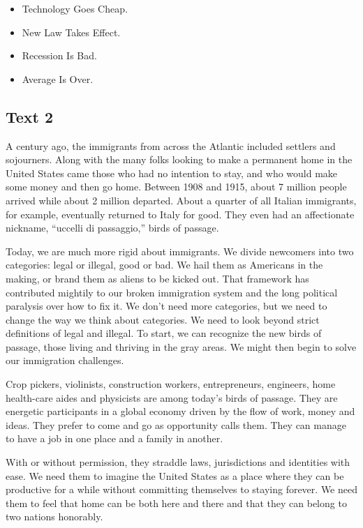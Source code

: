 \documentclass[UTF8,11pt]{ctexart}
\begin{document}
\begin{itemize}[leftmargin=2em,itemsep=.2em,topsep=.4em]\item[A.] Technology Goes Cheap.
\item[B.] New Law Takes Effect.
\item[C.] Recession Is Bad.
\item[D.] Average Is Over.
\end{itemize}

\subsection*{\textbf{Text 2}}


A century ago, the immigrants from across the Atlantic included settlers and sojourners. Along with the many folks looking to make a permanent home in the United States came those who had no intention to stay, and who would make some money and then go home. Between 1908 and 1915, about 7 million people arrived while about 2 million departed. About a quarter of all Italian immigrants, for example, eventually returned to Italy for good. They even had an affectionate nickname, “uccelli di passaggio,” birds of passage.


Today, we are much more rigid about immigrants. We divide newcomers into two categories: legal or illegal, good or bad. We hail them as Americans in the making, or brand them as aliens to be kicked out. That framework has contributed mightily to our broken immigration system and the long political paralysis over how to fix it. We don’t need more categories, but we need to change the way we think about categories. We need to look beyond strict definitions of legal and illegal. To start, we can recognize the new birds of passage, those living and thriving in the gray areas. We might then begin to solve our immigration challenges.


Crop pickers, violinists, construction workers, entrepreneurs, engineers, home health-care aides and physicists are among today’s birds of passage. They are energetic participants in a global economy driven by the flow of work, money and ideas. They prefer to come and go as opportunity calls them. They can manage to have a job in one place and a family in another.


With or without permission, they straddle laws, jurisdictions and identities with ease. We need them to imagine the United States as a place where they can be productive for a while without committing themselves to staying forever. We need them to feel that home can be both here and there and that they can belong to two nations honorably.
\end{document}
